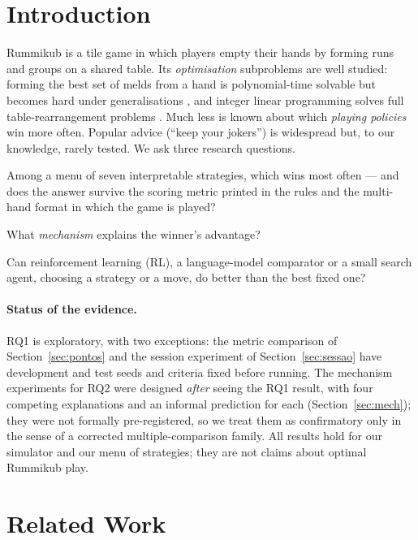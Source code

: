 \documentclass[11pt]{article}
\begin{document}
\section{Introduction}
Rummikub is a tile game in which players empty their hands by forming runs and groups on a shared table. Its \emph{optimisation} subproblems are well studied: forming the best set of melds from a hand is polynomial-time solvable but becomes hard under generalisations \cite{vanrijn2016}, and integer linear programming solves full table-rearrangement problems \cite{denhertog2006}. Much less is known about which \emph{playing policies} win more often. Popular advice (``keep your jokers'') is widespread but, to our knowledge, rarely tested.
We ask three research questions.
\begin{description}\itemsep0pt
\item[RQ1] Among a menu of seven interpretable strategies, which wins most often --- and does the answer survive the scoring metric printed in the rules and the multi-hand format in which the game is played?
\item[RQ2] What \emph{mechanism} explains the winner's advantage?
\item[RQ3] Can reinforcement learning (RL), a language-model comparator or a small search agent, choosing a strategy or a move, do better than the best fixed one?
\end{description}
\paragraph{Status of the evidence.} RQ1 is exploratory, with two exceptions: the metric comparison of Section~\ref{sec:pontos} and the session experiment of Section~\ref{sec:sessao} have development and test seeds and criteria fixed before running. The mechanism experiments for RQ2 were designed \emph{after} seeing the RQ1 result, with four competing explanations and an informal prediction for each (Section~\ref{sec:mech}); they were not formally pre-registered, so we treat them as confirmatory only in the sense of a corrected multiple-comparison family. All results hold for our simulator and our menu of strategies; they are not claims about optimal Rummikub play.

\section{Related Work}\label{sec:related}
\end{document}
